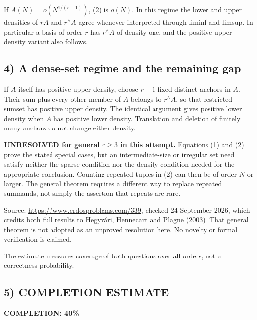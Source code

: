 If $A(N)=o(N^{1/(r-1)})$, (2) is $o(N)$. In this regime the lower and upper densities of $rA$ and $r^{\wedge}A$ agree whenever interpreted through liminf and limsup. In particular a basis of order $r$ has $r^{\wedge}A$ of density one, and the positive-upper-density variant also follows.

\subsection*{4) A dense-set regime and the remaining gap}
If $A$ itself has positive upper density, choose $r-1$ fixed distinct anchors in $A$. Their sum plus every other member of $A$ belongs to $r^{\wedge}A$, so that restricted sumset has positive upper density. The identical argument gives positive lower density when $A$ has positive lower density. Translation and deletion of finitely many anchors do not change either density.

\textbf{UNRESOLVED for general $r\ge3$ in this attempt.} Equations (1) and (2) prove the stated special cases, but an intermediate-size or irregular set need satisfy neither the sparse condition nor the density condition needed for the appropriate conclusion. Counting repeated tuples in (2) can then be of order $N$ or larger. The general theorem requires a different way to replace repeated summands, not simply the assertion that repeats are rare.

Source: \url{https://www.erdosproblems.com/339}, checked 24 September 2026, which credits both full results to Hegyv\'ari, Hennecart and Plagne (2003). That general theorem is not adopted as an unproved resolution here. No novelty or formal verification is claimed.

The estimate measures coverage of both questions over all orders, not a correctness probability.
\subsection*{5) COMPLETION ESTIMATE}
\textbf{COMPLETION: 40\%}
